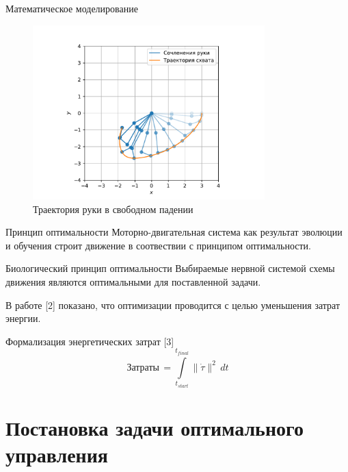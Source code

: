     \begin{frame}{Математическое моделирование}
        \begin{figure}
            \includegraphics[width=0.8\textwidth]{img/discrete_pendulum.pdf}
            \caption{Траектория руки в свободном падении}
        \end{figure}
    \end{frame}

    \begin{frame}{Принцип оптимальности}
        Моторно-двигательная система как результат эволюции и обучения строит движение в соотвествии с принципом оптимальности.
        \begin{block}{Биологический принцип оптимальности}
            Выбираемые нервной системой схемы движения являются оптимальными для поставленной задачи.
        \end{block}
        \vfill
        В работе [2] показано, что оптимизации проводится с целью уменьшения затрат энергии.
        \begin{block}{Формализация энергетических затрат [3]}
            $$
                \mbox{Затраты}\, = \int\limits_{t_{start}}^{t_{final}}\|\dot\tau\|^2\,dt
            $$
        \end{block}
    \end{frame}


    \section{Постановка задачи оптимального управления}

